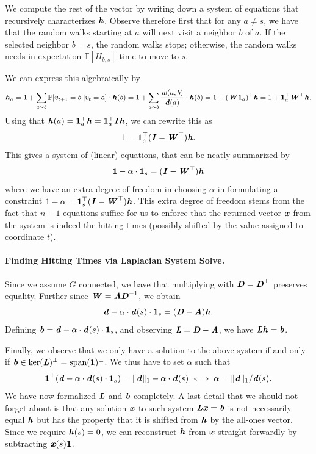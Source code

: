 We compute the rest of the vector by writing down a system of equations that recursively characterizes $\hh$. Observe therefore first that for any $a \neq s$, we have that the random walks starting at $a$ will next visit a neighbor $b$ of $a$. If the selected neighbor $b = s$, the random walks stops; otherwise, the random walks needs in expectation $\mathbb{E}[H_{b,s}]$ time to move to $s$. 

We can express this algebraically by
\[
\hh_a = 1 + \sum_{a \sim b} \mathbb{P}[v_{t+1} = b \;| v_t = a]  \cdot \hh(b) = 1 + \sum_{a \sim b} \frac{\ww(a,b)}{\dd(a)}  \cdot \hh(b) =  1 + (\WW\vecone_a)^{\trp} \hh = 1 + \vecone_a^{\trp} \WW^{\trp} \hh.
\]
Using that $\hh(a) = \vecone_a^{\trp} \hh =  \vecone_a^{\trp} \II \hh$, we can rewrite this as 
\[
1 = \vecone_a^\trp (\II - \WW^\trp) \hh.
\]
This gives a system of (linear) equations, that can be neatly summarized by 
\[
\vecone - \alpha \cdot \vecone_s = (\II - \WW^\trp) \hh
\]
where we have an extra degree of freedom in choosing $\alpha$ in formulating a constraint $1 - \alpha = \vecone_s^\trp (\II -\WW^\trp) \hh$. This extra degree of freedom stems from the fact that $n-1$ equations suffice for us to enforce that the returned vector $\xx$ from the system is indeed the hitting times (possibly shifted by the value assigned to coordinate $t$).

\paragraph{Finding Hitting Times via Laplacian System Solve.} Since we assume $G$ connected, we have that multiplying with $\DD = \DD^\trp$ preserves equality. Further since $\WW = \AA \DD^{-1}$, we obtain
\[
\dd - \alpha \cdot \dd(s) \cdot \vecone_s = (\DD - \AA) \hh.
\]
Defining $\bb = \dd - \alpha \cdot \dd(s) \cdot \vecone_s$, and observing $\LL = \DD - \AA$, we have $\LL\hh = \bb$. 

Finally, we observe that we only have a solution to the above system if and only if $\bb \in \ker(\LL)^\perp =  \Span(\vecone)^\perp$. We thus have to set $\alpha$ such that 
\[
\vecone^{\trp}(\dd - \alpha \cdot \dd(s) \cdot \vecone_s) = \|\dd\|_1 - \alpha \cdot \dd(s) \iff \alpha =  \|\dd\|_1 /\dd(s).
\]
We have now formalized $\LL$ and $\bb$ completely. A last detail that we should not forget about is that any solution $\xx$ to such system $\LL \xx = \bb$ is not necessarily equal $\hh$ but has the property that it is shifted from $\hh$ by the all-ones vector. Since we require $\hh(s) = 0$, we can reconstruct $\hh$ from $\xx$ straight-forwardly by subtracting $\xx(s) \vecone$.

